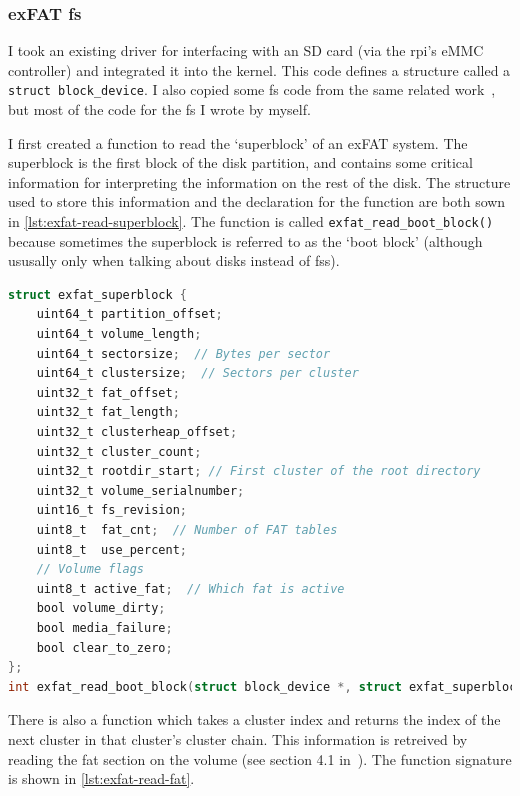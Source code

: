 \documentclass{article}
\begin{document}
\subsubsection{exFAT \texorpdfstring{\gls{fs}}{Filesystem}}
\label{sec:impl_fs}
I took an existing driver for interfacing with an SD card (via the \gls{rpi}'s
eMMC controller) and integrated it into the kernel. This code defines a
structure called a \verb!struct block_device!. I also copied some \gls{fs} code
from the same related work~\cite{rpi-boot-gh}, but most of the code for the
\gls{fs} I wrote by myself.

I first created a function to read the `superblock' of an exFAT system. The
superblock is the first block of the disk partition, and contains some critical
information for interpreting the information on the rest of the disk. The
structure used to store this information and the declaration for the function
are both sown in \autoref{lst:exfat-read-superblock}. The function is called
\verb!exfat_read_boot_block()! because sometimes the superblock is referred to
as the `boot block' (although ususally only when talking about disks instead of
\glspl{fs}).

\begin{lstlisting}[language=C, caption={The structure used to represent the
                   exFAT superblock information, and the declaration of the
                   function used to read it}, float,
                   label={lst:exfat-read-superblock}]
struct exfat_superblock {
    uint64_t partition_offset;
    uint64_t volume_length;
    uint64_t sectorsize;  // Bytes per sector
    uint64_t clustersize;  // Sectors per cluster
    uint32_t fat_offset;
    uint32_t fat_length;
    uint32_t clusterheap_offset;
    uint32_t cluster_count;
    uint32_t rootdir_start; // First cluster of the root directory
    uint32_t volume_serialnumber;
    uint16_t fs_revision;
    uint8_t  fat_cnt;  // Number of FAT tables
    uint8_t  use_percent;
    // Volume flags
    uint8_t active_fat;  // Which fat is active
    bool volume_dirty;
    bool media_failure;
    bool clear_to_zero;
};
int exfat_read_boot_block(struct block_device *, struct exfat_superblock *);
\end{lstlisting}

There is also a function which takes a cluster index and returns the index of
the next cluster in that cluster's cluster chain. This information is retreived
by reading the \gls{fat} section on the volume (see section 4.1
in~\cite{exFAT-specs}). The function signature is shown in
\autoref{lst:exfat-read-fat}.
\end{document}
